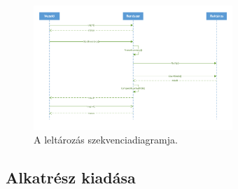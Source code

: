 \documentclass[12pt]{article}\usepackage[left=20mm,right=20mm,top=15mm,bottom=20mm]{geometry}
\begin{document}
\begin{figure}[!h]
    \centering
        \includegraphics[width=0.67\textwidth]{kepek/leltarazas_SD.pdf}
        \caption{A leltározás szekvenciadiagramja.}
\end{figure}

\subsection{Alkatrész kiadása}
\end{document}

